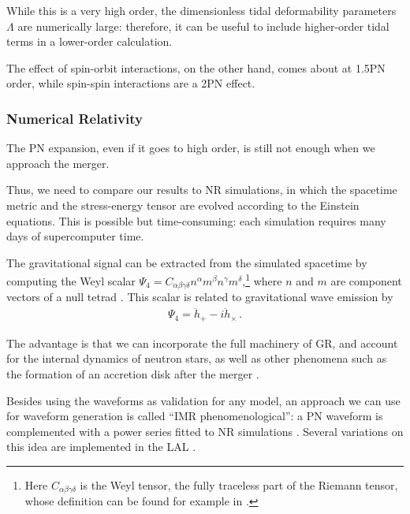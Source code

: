 \documentclass[main.tex]{subfiles}
\begin{document}
While this is a very high order, the dimensionless tidal deformability parameters \(\Lambda \) are numerically large: therefore, it can be useful to include higher-order tidal terms in a lower-order calculation. 

The effect of spin-orbit interactions, on the other hand, comes about at 1.5PN order, while spin-spin interactions are a 2PN effect.

\subsubsection{Numerical Relativity} \label{sec:nr}

The \ac{PN} expansion, even if it goes to high order, is still not enough when we approach the merger. 

Thus, we need to compare our results to \ac{NR} simulations, in which the spacetime metric and the stress-energy tensor are evolved according to the Einstein equations. 
This is possible but time-consuming: each simulation requires many days of supercomputer time. 

The gravitational signal can be extracted from the simulated spacetime by computing the Weyl scalar \(\Psi_{4} = C_{\alpha \beta \gamma \delta }n^\alpha m^\beta n^\gamma m^\delta \),\footnote{Here \(C_{\alpha \beta \gamma \delta }\) is the Weyl tensor, the fully traceless part of the Riemann tensor, whose definition can be found for example in \textcite[eq.\ 2.18]{gourgoulhonFormalismBasesNumerical2007}.} where \(n\) and \(m\) are component vectors of a null tetrad \cite[sec.\ 5.6.3]{lofflerEinsteinToolkitCommunity2012}. This scalar is related to gravitational wave emission by 
%
\begin{align}
\Psi_{4} = \ddot{h}_+ - i \ddot{h}_{\times }
\,.
\end{align}


The advantage is that we can incorporate the full machinery of \ac{GR}, and account for the internal dynamics of neutron stars, as well as other phenomena such as the formation of an accretion disk after the merger \cite{nedoraNumericalRelativitySimulations2020}.

Besides using the waveforms as validation for any model, 
an approach we can use for waveform generation is called ``\ac{IMR} phenomenological'': a \ac{PN} waveform is complemented with a power series fitted to \ac{NR} simulations \cite{kumarAccuracyPrecisionGravitationalwave2015}. 
Several variations on this idea are implemented in the \ac{LAL} \cite[]{ligoscientificcollaborationLIGOAlgorithmLibrary2018}.
\end{document}
